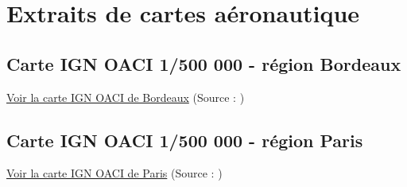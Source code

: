 \section{Extraits de cartes aéronautique}
\subsection{Carte IGN OACI 1/500 000 - région Bordeaux}
\hyperlink{ignOaciBordeaux.1}{Voir la carte IGN OACI de Bordeaux} (Source : \cite{img:ignOaciBordeaux})

\subsection{Carte IGN OACI 1/500 000 - région Paris}
\hyperlink{ignOaciParis.1}{Voir la carte IGN OACI de Paris} (Source : \cite{img:ignOaciParis})




